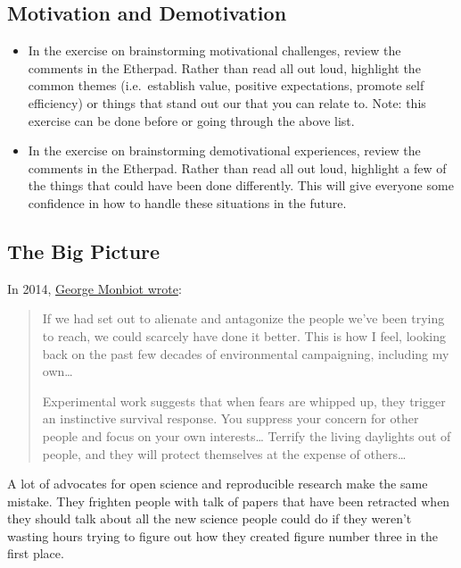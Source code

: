\subsection{Motivation and
Demotivation}\label{motivation-and-demotivation}

\begin{itemize}
\item
  In the exercise on brainstorming motivational challenges, review the
  comments in the Etherpad. Rather than read all out loud, highlight the
  common themes (i.e.~establish value, positive expectations, promote
  self efficiency) or things that stand out our that you can relate to.
  Note: this exercise can be done before or going through the above
  list.
\item
  In the exercise on brainstorming demotivational experiences, review
  the comments in the Etherpad. Rather than read all out loud, highlight
  a few of the things that could have been done differently. This will
  give everyone some confidence in how to handle these situations in the
  future.
\end{itemize}

\subsection{The Big Picture}\label{the-big-picture}

In 2014,
\href{http://www.theguardian.com/commentisfree/2014/jun/16/saving-the-world-promise-not-fear-nature-environmentalism}{George
Monbiot wrote}:

\begin{quote}
If we had set out to alienate and antagonize the people we've been
trying to reach, we could scarcely have done it better. This is how I
feel, looking back on the past few decades of environmental campaigning,
including my own\ldots{}

Experimental work suggests that when fears are whipped up, they trigger
an instinctive survival response. You suppress your concern for other
people and focus on your own interests\ldots{} Terrify the living
daylights out of people, and they will protect themselves at the expense
of others\ldots{}
\end{quote}

A lot of advocates for open science and reproducible research make the
same mistake. They frighten people with talk of papers that have been
retracted when they should talk about all the new science people could
do if they weren't wasting hours trying to figure out how they created
figure number three in the first place.

